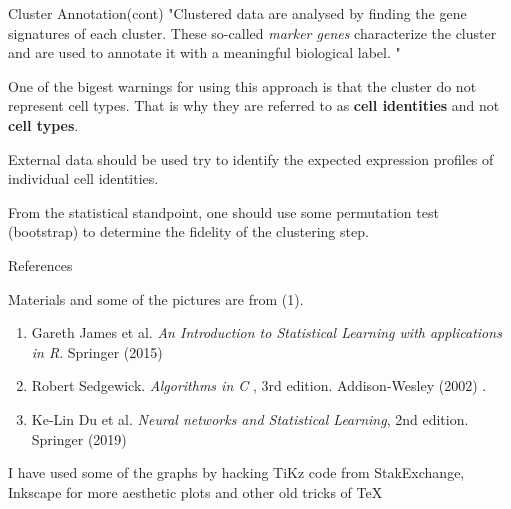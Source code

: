 \documentclass{beamer}
\begin{document}
\begin{frame}{Cluster Annotation(cont)}
	"Clustered data are analysed by finding the gene signatures of each cluster. These so-called {\it marker genes} characterize the cluster and are used to annotate it with a meaningful biological label. "
	
	One of the bigest warnings for using this approach is that the cluster do not represent cell types. 
That is why they are referred to as {\bf cell identities} and not {\bf cell types}.

External data should be used try to identify the expected expression profiles of individual cell identities.

From the statistical standpoint, one should use some permutation test (bootstrap) to determine the fidelity of the clustering step. 

\end{frame}	
	
	\begin{frame}{References}
		
		Materials and some of the pictures are from (1). 
		\begin{enumerate}
			\item Gareth James et al. {\it An Introduction to Statistical Learning with applications in R}. Springer (2015)
			\item Robert Sedgewick. {\it Algorithms in C }, 3rd edition. Addison-Wesley (2002) . 
			\item Ke-Lin Du et al. {\it Neural networks and Statistical Learning}, 2nd edition. Springer (2019)
			
		\end{enumerate}	
		
		I have used some of the graphs by hacking TiKz code from StakExchange, Inkscape for more aesthetic plots and other old tricks of \TeX
	\end{frame}	

	
\end{document}

